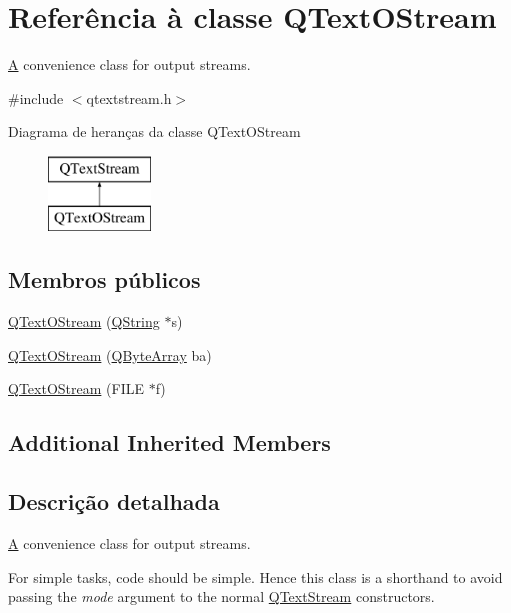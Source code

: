 \hypertarget{class_q_text_o_stream}{\section{Referência à classe Q\-Text\-O\-Stream}
\label{class_q_text_o_stream}
}


\hyperlink{class_a}{A} convenience class for output streams.  




{\ttfamily \#include $<$qtextstream.\-h$>$}

Diagrama de heranças da classe Q\-Text\-O\-Stream\begin{figure}[H]
\begin{center}
\leavevmode
\includegraphics[height=2.000000cm]{class_q_text_o_stream}
\end{center}
\end{figure}
\subsection*{Membros públicos}
\begin{DoxyCompactItemize}
\item 
\hyperlink{class_q_text_o_stream_aa5634f62c20b524e3ed4f09c7b15a575}{Q\-Text\-O\-Stream} (\hyperlink{class_q_string}{Q\-String} $\ast$s)
\item 
\hyperlink{class_q_text_o_stream_af777710c21c251449ba824025eb38d0e}{Q\-Text\-O\-Stream} (\hyperlink{class_q_array}{Q\-Byte\-Array} ba)
\item 
\hyperlink{class_q_text_o_stream_a4862be151cde154835b5768eb16db453}{Q\-Text\-O\-Stream} (F\-I\-L\-E $\ast$f)
\end{DoxyCompactItemize}
\subsection*{Additional Inherited Members}


\subsection{Descrição detalhada}
\hyperlink{class_a}{A} convenience class for output streams. 

For simple tasks, code should be simple. Hence this class is a shorthand to avoid passing the {\itshape mode} argument to the normal \hyperlink{class_q_text_stream}{Q\-Text\-Stream} constructors.

